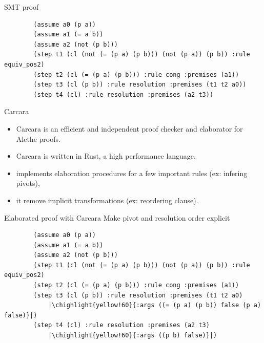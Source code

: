 \documentclass[aspectratio=169,xcolor={dvipsnames}]{beamer}
\newcommand\chighlight[2]{\setlength{\fboxsep}{0pt}\colorbox{#1}{#2\strut}}
\begin{document}
\begin{frame}[fragile]{SMT proof}
    \begin{verbatim}
        (assume a0 (p a))
        (assume a1 (= a b))
        (assume a2 (not (p b)))
        (step t1 (cl (not (= (p a) (p b))) (not (p a)) (p b)) :rule equiv_pos2)
        (step t2 (cl (= (p a) (p b))) :rule cong :premises (a1))
        (step t3 (cl (p b)) :rule resolution :premises (t1 t2 a0))
        (step t4 (cl) :rule resolution :premises (a2 t3))
    \end{verbatim}
\end{frame}

\begin{frame}{Carcara}
    \begin{itemize}
    \item Carcara is an efficient and independent proof checker and
    elaborator for Alethe proofs.
    \item Carcara is written in Rust, a high performance language,
    \item implements elaboration procedures for a few important rules (ex: infering pivots),
    \item it remove implicit transformations (ex: reordering clause).
    \end{itemize}
\end{frame}


\begin{frame}[fragile]{Elaborated proof with Carcara}
    Make pivot and resolution order explicit\\
    \begin{verbatim}
        (assume a0 (p a))
        (assume a1 (= a b))
        (assume a2 (not (p b)))
        (step t1 (cl (not (= (p a) (p b))) (not (p a)) (p b)) :rule equiv_pos2)
        (step t2 (cl (= (p a) (p b))) :rule cong :premises (a1))
        (step t3 (cl (p b)) :rule resolution :premises (t1 t2 a0)
            |\chighlight{yellow!60}{:args ((= (p a) (p b)) false (p a) false)}|)
        (step t4 (cl) :rule resolution :premises (a2 t3)
            |\chighlight{yellow!60}{:args ((p b) false)}|)
    \end{verbatim}
\end{frame}
\end{document}
